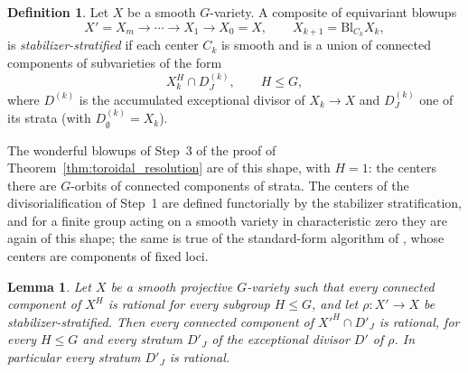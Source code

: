 \documentclass[11pt]{amsart}
\theoremstyle{plain}
\newtheorem{lemma}[theorem]{Lemma}
\theoremstyle{definition}
\newtheorem{definition}[theorem]{Definition}
\theoremstyle{remark}
\numberwithin{equation}{section}
\begin{document}
\begin{definition} \label{def:stratified_tower}
Let $X$ be a smooth $G$-variety.  A composite of equivariant blowups
\[
X' = X_m \to \cdots \to X_1 \to X_0 = X , \qquad
X_{k+1} = \mathrm{Bl}_{C_k} X_k ,
\]
is \emph{stabilizer-stratified} if each center $C_k$ is smooth and is a
union of connected components of subvarieties of the form
\[
X_k^{H} \cap D^{(k)}_J , \qquad H \leq G ,
\]
where $D^{(k)}$ is the accumulated exceptional divisor of $X_k \to X$ and
$D^{(k)}_J$ one of its strata (with $D^{(k)}_\emptyset = X_k$).
\end{definition}

The wonderful blowups of Step~3 of the proof of
Theorem~\ref{thm:toroidal_resolution} are of this shape, with $H = 1$: the
centers there are $G$-orbits of connected components of strata.  The
centers of the divisorialification of Step~1 are defined functorially by
the stabilizer stratification, and for a finite group acting on a smooth
variety in characteristic zero they are again of this shape; the same is
true of the standard-form algorithm of \cite{ReichsteinYoussin}, whose
centers are components of fixed loci.

\begin{lemma} \label{lem:rational_strata_propagate}
Let $X$ be a smooth projective $G$-variety such that every connected
component of $X^H$ is rational for every subgroup $H \leq G$, and let
$\rho : X' \to X$ be stabilizer-stratified.  Then every connected component
of $X'^{H} \cap D'_J$ is rational, for every $H \leq G$ and every stratum
$D'_J$ of the exceptional divisor $D'$ of $\rho$.  In particular every
stratum $D'_J$ is rational.
\end{lemma}
\end{document}
